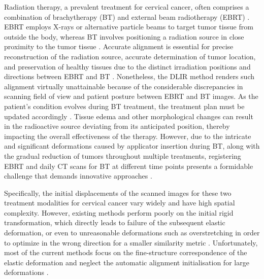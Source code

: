 \documentclass[preprint,review,12pt]{elsarticle}
\begin{document}
Radiation therapy, a prevalent treatment for cervical cancer, often comprises a combination of brachytherapy (BT) and external beam radiotherapy (EBRT) \cite{Ma2021DeepLA}. EBRT employs X-rays or alternative particle beams to target tumor tissue from outside the body, whereas BT involves positioning a radiation source in close proximity to the tumor tissue \cite{vordermark2016radiotherapy}. Accurate alignment is essential for precise reconstruction of the radiation source, accurate determination of tumor location, and preservation of healthy tissues due to the distinct irradiation positions and directions between EBRT and BT \cite{swamidas2020image}. Nonetheless, the DLIR method renders such alignment virtually unattainable because of the considerable discrepancies in scanning field of view and patient posture between EBRT and BT images. As the patient's condition evolves during BT treatment, the treatment plan must be updated accordingly \cite{Rigaud2019DeformableIR}. Tissue edema and other morphological changes can result in the radioactive source deviating from its anticipated position, thereby impacting the overall effectiveness of the therapy. However, due to the intricate and significant deformations caused by applicator insertion during BT, along with the gradual reduction of tumors throughout multiple treatments, registering EBRT and daily CT scans for BT at different time points presents a formidable challenge that demands innovative approaches \cite{Bondar2012IndividualizedNA}.

Specifically, the initial displacements of the scanned images for these two treatment modalities for cervical cancer vary widely and have high spatial complexity. However, existing methods perform poorly on the initial rigid transformation, which directly leads to failure of the subsequent elastic deformation, or even to unreasonable deformations such as overstretching in order to optimize in the wrong direction for a smaller similarity metric \cite{Bondar2010ASN}. Unfortunately, most of the current methods focus on the fine-structure correspondence of the elastic deformation and neglect the automatic alignment initialisation for large deformations \cite{r11,r12,r13}.
\end{document}
